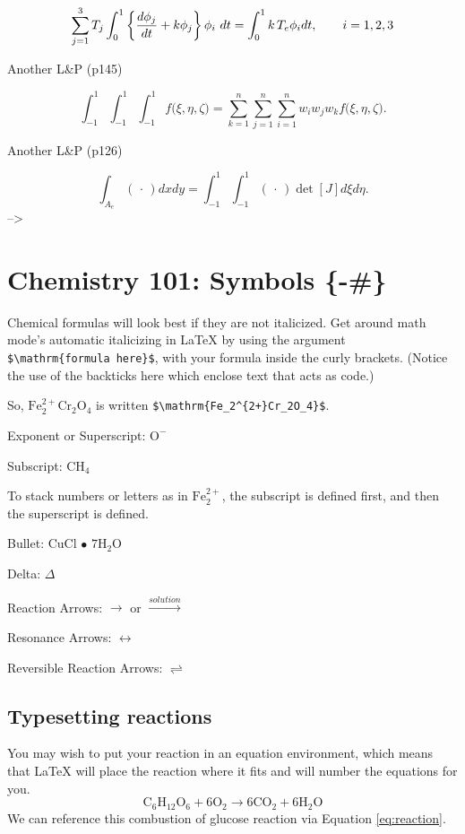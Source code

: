\documentclass[ms]{uncgdissertationexp}
\theoremstyle{plain}
\theoremstyle{definition}
\theoremstyle{remark}
\begin{document}
  \[
  \sum_{j=1}^3 T_j\int_0^1\left\{{d\phi_j\over dt} + k\phi_j\right\} \phi_i\ dt
     = \int_{0}^1k\,T_e\phi_idt, \qquad i=1,2,3 \]
  
  Another L\&P (p145)
  
  \[
  \int_{-1}^1\!\int_{-1}^1\!\int_{-1}^1 f\big(\xi,\eta,\zeta\big)
     = \sum_{k=1}^n\sum_{j=1}^n\sum_{i=1}^n w_i w_j w_k f\big( \xi,\eta,\zeta\big).
  \]
  
  Another L\&P (p126)
  
  \[
  \int_{A_e} (\,\cdot\,) dx dy = \int_{-1}^1\!\int_{-1}^1 (\,\cdot\,) \det[J] d\xi d\eta.
  \] --\textgreater{}
  
  \section{Chemistry 101: Symbols \{-\#\}}\label{chemistry-101-symbols--}
  
  Chemical formulas will look best if they are not italicized. Get around
  math mode's automatic italicizing in LaTeX by using the argument
  \texttt{\$\textbackslash{}mathrm\{formula\ here\}\$}, with your formula
  inside the curly brackets. (Notice the use of the backticks here which
  enclose text that acts as code.)
  
  So, \(\mathrm{Fe_2^{2+}Cr_2O_4}\) is written
  \texttt{\$\textbackslash{}mathrm\{Fe\_2\^{}\{2+\}Cr\_2O\_4\}\$}.
  
  \noindent Exponent or Superscript: \(\mathrm{O^-}\)
  
  \noindent Subscript: \(\mathrm{CH_4}\)
  
  To stack numbers or letters as in \(\mathrm{Fe_2^{2+}}\), the subscript
  is defined first, and then the superscript is defined.
  
  \noindent Bullet: CuCl \(\bullet\) \(\mathrm{7H_{2}O}\)
  
  \noindent Delta: \(\Delta\)
  
  \noindent Reaction Arrows: \(\longrightarrow\) or
  \(\xrightarrow{solution}\)
  
  \noindent Resonance Arrows: \(\leftrightarrow\)
  
  \noindent Reversible Reaction Arrows: \(\rightleftharpoons\)
  
  \subsection{Typesetting reactions}\label{typesetting-reactions}
  
  You may wish to put your reaction in an equation environment, which
  means that LaTeX will place the reaction where it fits and will number
  the equations for you.
  \begin{equation}
    \mathrm{C_6H_{12}O_6  + 6O_2} \longrightarrow \mathrm{6CO_2 + 6H_2O}
    \label{eq:reaction}
  \end{equation}
  We can reference this combustion of glucose reaction via Equation
  \eqref{eq:reaction}.
  
\end{document}
